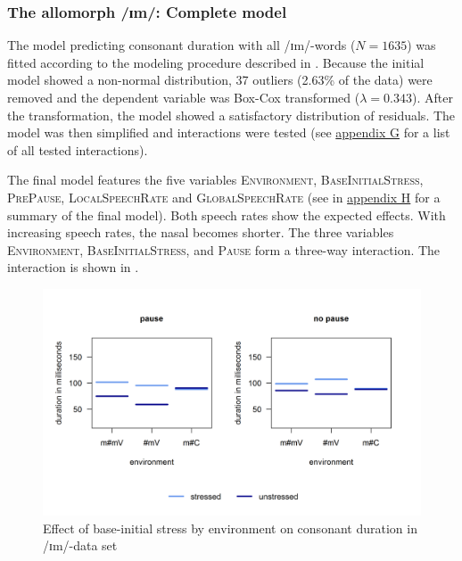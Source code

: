 \subsubsection{The allomorph /ɪm/: Complete model}

The model predicting consonant duration with all /ɪm/-words ($N=1635$) was fitted according to the modeling procedure described in .  Because the initial model showed a non-normal distribution,  37 outliers (2.63\% of the data) were removed and the dependent variable was Box-Cox transformed ($\lambda = 0.343$). 
After the transformation, the model showed a satisfactory distribution of residuals. The model was then simplified and interactions were tested (see \hyperref[Appendix G Summaries of tested interactions in experimental study]{appendix G} for a list of all tested interactions). 

 
The final model features the five variables \textsc{Environment}, \textsc{BaseInitialStress}, \textsc{PrePause}, \textsc{LocalSpeechRate} and \textsc{GlobalSpeechRate} (see  in \hyperref[Appendix H: Model Summaries Experiment]{appendix H} for a summary of the final model). Both speech rates show the expected effects. With increasing speech rates, the nasal becomes shorter. The three variables \textsc{Environment}, \textsc{BaseInitialStress}, and \textsc{Pause} form a three-way interaction. The interaction is shown in .

\begin{figure} [h!]
	\centering
	\includegraphics [scale=0.6] {images/Experiment/imModelCompleteInterEnvStressPause}
	\vspace*{-0.4cm}
	\caption{Effect of base-initial stress by environment on consonant duration in /ɪm/-data set}
	\label{fig:NumNasal imCompleteexperiment}
\end{figure}


